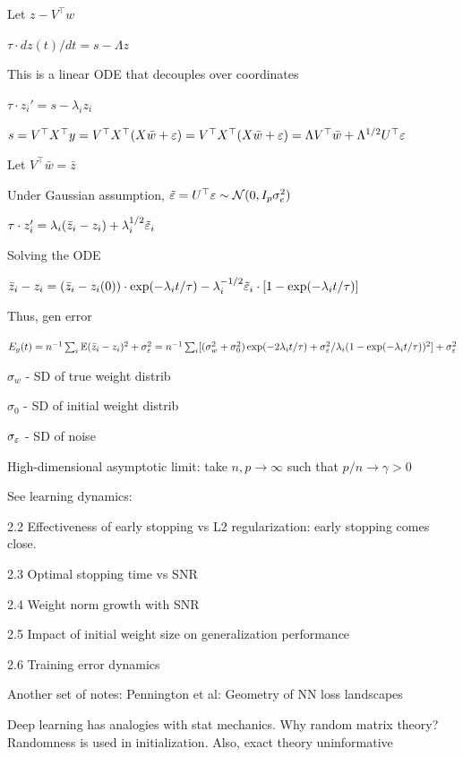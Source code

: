 \documentclass[english]{article}
\begin{document}
Let $z - V^\top w$

$\tau \cdot dz(t)/dt  =  s- \Lambda z$

This is a linear ODE that decouples over coordinates

$\tau \cdot z_i'  =  s- \lambda_i z_i$

$s = V^\top X^\top y =  V^\top X^\top (X\bar w+\varepsilon) =  V^\top X^\top (X\bar  w+\varepsilon) =  \Lambda V^\top\bar  w+ \Lambda^{1/2} U^\top \varepsilon$

Let $V^\top \bar w = \bar z$

Under Gaussian assumption, $\tilde {\varepsilon} = U^\top \varepsilon \sim \mathcal{N}(0,I_p\sigma_e^2)$

$\tau \cdot z_i'  =   \lambda_i (\bar z_i-z_i)+ \lambda_i^{1/2}\tilde {\varepsilon}_i$

Solving the ODE

$\bar z_i-z_i = (\bar z_i-z_i(0))\cdot \exp(-\lambda_i t/\tau) - \lambda_i^{-1/2}\tilde {\varepsilon}_i\cdot[1- \exp(-\lambda_i t/\tau)]$

Thus, gen error

$E_g(t) = n^{-1}  \sum_i  \mathbb{E} (\bar z_i-z_i)^2+\sigma_\varepsilon^2 =  
n^{-1}  \sum_i  [(\sigma_w^2+\sigma_0^2)\exp(-2\lambda_i t/\tau)+\sigma_\varepsilon^2/\lambda_i(1- \exp(-\lambda_i t/\tau))^2]+\sigma_\varepsilon^2$

$\sigma_w$ - SD of true weight distrib

$\sigma_0$ - SD of initial weight distrib

$\sigma_\varepsilon$ - SD of noise

\item 
High-dimensional asymptotic limit: take $n,p \to \infty$ such that $p/n\to \gamma>0$

See learning dynamics: 

2.2 Effectiveness of early stopping vs L2 regularization: early stopping comes close.

2.3 Optimal stopping time vs SNR

2.4 Weight norm growth with SNR

2.5 Impact of initial weight size on generalization performance

2.6 Training error dynamics
\eenum

Another set of notes: Pennington et al: Geometry of NN loss landscapes


\benum

\item Deep learning has analogies with stat mechanics. Why random matrix theory? Randomness is used in initialization. Also, exact theory uninformative
\end{document}
